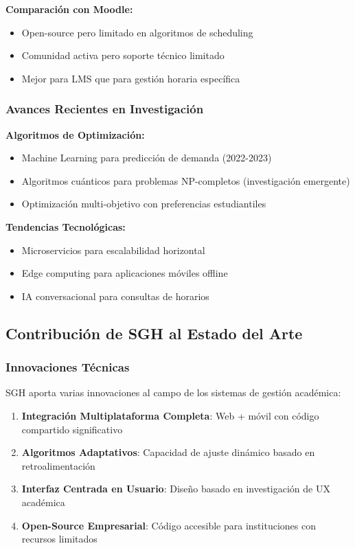 \textbf{Comparación con Moodle:}
\begin{itemize}
\item Open-source pero limitado en algoritmos de scheduling
\item Comunidad activa pero soporte técnico limitado
\item Mejor para LMS que para gestión horaria específica
\end{itemize}

\subsubsection{Avances Recientes en Investigación}

\textbf{Algoritmos de Optimización:}
\begin{itemize}
\item Machine Learning para predicción de demanda (2022-2023)
\item Algoritmos cuánticos para problemas NP-completos (investigación emergente)
\item Optimización multi-objetivo con preferencias estudiantiles
\end{itemize}

\textbf{Tendencias Tecnológicas:}
\begin{itemize}
\item Microservicios para escalabilidad horizontal
\item Edge computing para aplicaciones móviles offline
\item IA conversacional para consultas de horarios
\end{itemize}

\subsection{Contribución de SGH al Estado del Arte}

\subsubsection{Innovaciones Técnicas}

SGH aporta varias innovaciones al campo de los sistemas de gestión académica:

\begin{enumerate}
\item \textbf{Integración Multiplataforma Completa}: Web + móvil con código compartido significativo
\item \textbf{Algoritmos Adaptativos}: Capacidad de ajuste dinámico basado en retroalimentación
\item \textbf{Interfaz Centrada en Usuario}: Diseño basado en investigación de UX académica
\item \textbf{Open-Source Empresarial}: Código accesible para instituciones con recursos limitados
\end{enumerate}

